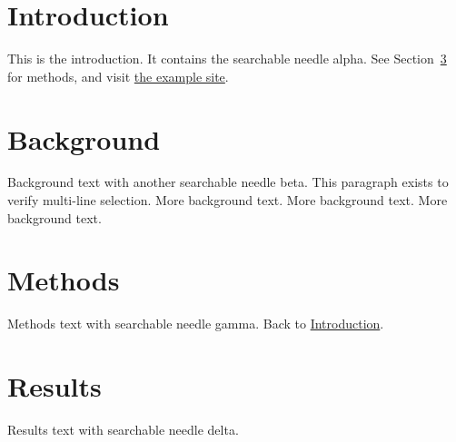 \documentclass[11pt]{article}
\begin{document}
\tableofcontents
\newpage
\section{Introduction}\label{sec:intro}
This is the introduction. It contains the searchable needle alpha.
See Section~\ref{sec:methods} for methods, and visit \href{https://example.com}{the example site}.

\newpage
\section{Background}
Background text with another searchable needle beta. This paragraph exists to verify multi-line selection.
More background text. More background text. More background text.

\newpage
\section{Methods}\label{sec:methods}
Methods text with searchable needle gamma. Back to \hyperref[sec:intro]{Introduction}.

\newpage
\section{Results}
Results text with searchable needle delta.
\end{document}
